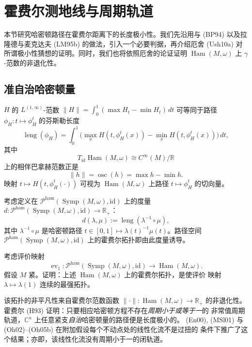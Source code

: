 \section{霍费尔测地线与周期轨道}
\label{sec:hofer-geodesics-periodic-orbits}

本节研究哈密顿路径在霍费尔距离下的长度极小性。我们先沿用\personBialy{}与\personPolterovich{}
(BP94) 以及拉隆德与麦克达夫 (LM95b) 的做法，引入一个必要判据，再介绍厄舍 (Ush10a)
对所谓极小性猜想的证明。同时，我们也将依照厄舍的论证证明
$\operatorname{Ham}(M,\omega)$ 上 $\gamma$-范数的非退化性。

\subsection{准自治哈密顿量}

$H$ 的 $L^{(1,\infty)}$-范数
$\lVert H\rVert=\int_0^1(\max H_t-\min H_t)\,dt$ 可等同于路径
$\phi_H:t\mapsto\phi_H^t$ 的芬斯勒长度
\[
 \operatorname{leng}(\phi_H)=\int_0^1
 \bigl(\max_xH(t,\phi_H^t(x))-\min_xH(t,\phi_H^t(x))\bigr)\,dt,
\]
其中
\[
 T_{\mathrm{id}}\operatorname{Ham}(M,\omega)
 \cong C^\infty(M)/\mathbb R
\]
上的相伴巴拿赫范数正是
\[
 \lVert h\rVert=\operatorname{osc}(h)=\max h-\min h.
\]
映射 $t\mapsto H(t,\phi_H^t(\mathord\cdot))$ 可视为
$\operatorname{Ham}(M,\omega)$ 上路径 $t\mapsto\phi_H^t$ 的切向量。

\begin{definition}
\label{def:22-hofer-path-metric}
考虑定义在
$\mathcal P^{\mathrm{ham}}(\operatorname{Symp}(M,\omega),\mathrm{id})$ 上的度量
$d:\mathcal P^{\mathrm{ham}}(\operatorname{Symp}(M,\omega),\mathrm{id})
\to\mathbb R_+$：
\[
 d(\lambda,\mu):=\operatorname{leng}(\lambda^{-1}\circ\mu),
\]
其中 $\lambda^{-1}\circ\mu$ 是哈密顿路径
$t\in[0,1]\mapsto\lambda(t)^{-1}\mu(t)$。路径空间
$\mathcal P^{\mathrm{ham}}(\operatorname{Symp}(M,\omega),\mathrm{id})$
上的霍费尔拓扑即由此度量诱导。
\end{definition}

\begin{exercise}
\label{ex:22-hofer-quotient-topology}
考虑评价映射
\[
 \operatorname{ev}_1:
 \mathcal P^{\mathrm{ham}}(\operatorname{Symp}(M,\omega),\mathrm{id})
 \longrightarrow\operatorname{Ham}(M,\omega).
\]
假设 $M$ 紧。证明：上述 $\operatorname{Ham}(M,\omega)$ 上的霍费尔拓扑，是使评价
映射 $\lambda\mapsto\lambda(1)$ 连续的最强拓扑。
\end{exercise}

该拓扑的非平凡性来自霍费尔范数函数
$\lVert\mathord\cdot\rVert:\operatorname{Ham}(M,\omega)\to\mathbb R_+$
的非退化性。霍费尔 (H93) 证明：只要相应哈密顿方程不存在\emph{周期小于或等于一}的
非常值周期轨道，$\mathbb C^n$ 上任意紧支\emph{自治}哈密顿量的路径便是长度极小的。
(En00), (MSl01) 与 (Oh02)--(Oh05b) 在附加假设每个不动点处的线性化流不是过扭的
条件下推广了这个结果；亦即，该线性化流没有周期小于一的闭轨道。

